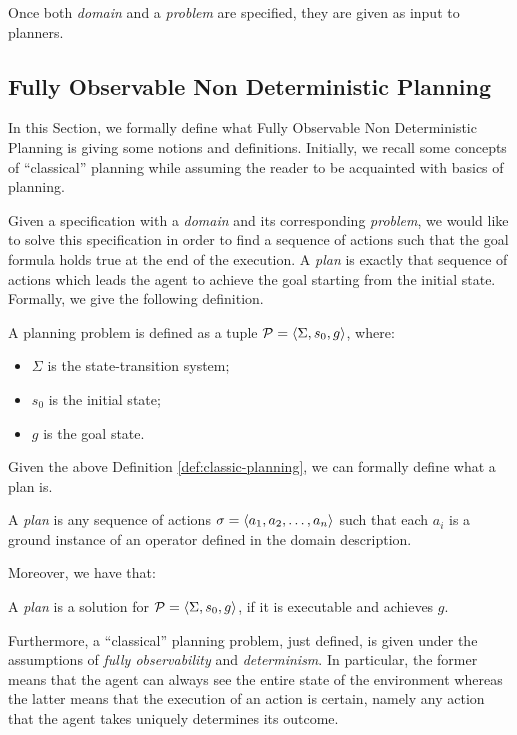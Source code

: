 Once both \PDDL \textit{domain} and a \textit{problem} are specified, they are given as input to planners.
\subsection{Fully Observable Non Deterministic Planning}\label{sec:fond}
In this Section, we formally define what Fully Observable Non Deterministic Planning is giving some notions and definitions. Initially, we recall some concepts of ``classical'' planning while assuming the reader to be acquainted with basics of planning.

Given a \PDDL specification with a \textit{domain} and its corresponding \textit{problem}, we would like to solve this specification in order to find a sequence of actions such that the goal formula holds true at the end of the execution. A \textit{plan} is exactly that sequence of actions which leads the agent to achieve the goal starting from the initial state. Formally, we give the following definition.

\begin{definition}\label{def:classic-planning}
A planning problem is defined as a tuple $\mathcal{P} = \langle \Sigma, s_0, g \rangle$, where:
\begin{itemize}
\item $\Sigma$ is the state-transition system;
\item $s_0$ is the initial state;
\item $g$ is the goal state.
\end{itemize}
\end{definition}

\noindent Given the above Definition \ref{def:classic-planning}, we can formally define what a plan is.

\begin{definition}\label{def:plan}
A \textit{plan} is any sequence of actions $\sigma = \langle a_1,a_2,\dots, a_n \rangle$ such that each $a_i$ is a ground instance of an operator defined in the domain description.
\end{definition}

\noindent Moreover, we have that:

\begin{definition}\label{def:plan-sol}
A \textit{plan} is a solution for $\mathcal{P} = \langle \Sigma, s_0, g \rangle$, if it is executable and achieves $g$.
\end{definition}

Furthermore, a ``classical'' planning problem, just defined, is given under the assumptions of \textit{fully observability} and \textit{determinism}. In particular, the former means that the agent can always see the entire state of the environment whereas the latter means that the execution of an action is certain, namely any action that the agent takes uniquely determines its outcome.

